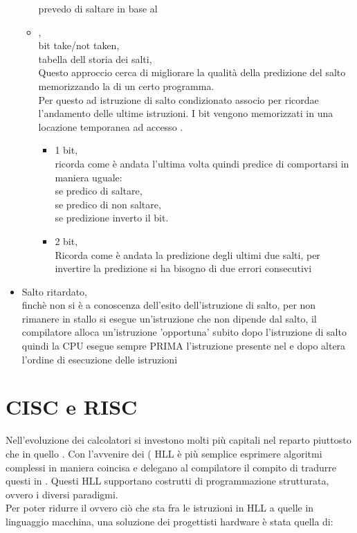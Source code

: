 \documentclass[arch.tex]{subfiles}
\begin{document}
\begin{itemize}
\begin{itemize}
				prevedo di saltare in base al  
			\item {},\\
				bit take/not taken,\\
				tabella dell storia dei salti,\\
				Questo approccio cerca di migliorare la qualità della 
				predizione del salto memorizzando la  di un certo programma.\\
				Per questo ad  istruzione di salto condizionato
				associo  per ricordae l'andamento delle ultime
				istruzioni. I bit vengono memorizzati in una locazione temporanea
				ad accesso .
				\begin{itemize}
					\item 1 bit,\\
						ricorda come è andata l'ultima volta quindi
						predice di comportarsi in maniera uguale:\\
						se  predico di saltare,\\
						se  predico di non saltare,\\
						se  predizione inverto il bit.
					\item 2 bit,\\
						Ricorda come è andata la predizione degli ultimi
						due salti, per invertire la predizione si 
						ha bisogno di due errori consecutivi
				\end{itemize}
		\end{itemize}
	\item Salto ritardato,\\
		finchè non si è a conoscenza dell'esito dell'istruzione di salto, per non
		rimanere in stallo si esegue un'istruzione che non dipende dal salto,
		il compilatore alloca un'istruzione 'opportuna' subito dopo l'istruzione 
		di salto quindi la CPU esegue sempre PRIMA l'istruzione presente nel 
		 e dopo altera l'ordine di esecuzione  delle istruzioni
\end{itemize}

\section{CISC e RISC}%
\label{sec:cisc_e_risc}

Nell'evoluzione dei calcolatori si investono molti più capitali nel reparto  
piuttosto che in quello . Con l'avvenire dei  ( HLL 
è più semplice esprimere algoritmi complessi in maniera coincisa e delegano al compilatore il 
compito di tradurre questi in . Questi HLL supportano costrutti
di programmazione strutturata, ovvero i diversi paradigmi.\\
Per poter ridurre il  ovvero ciò che sta fra le istruzioni in HLL a quelle
in linguaggio macchina, una soluzione dei progettisti hardware è stata quella di:
\end{document}
